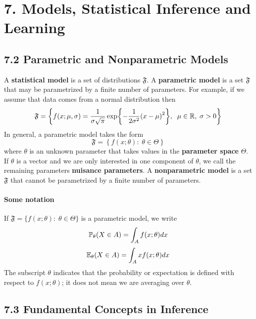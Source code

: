 \section*{7. Models, Statistical Inference and Learning}\label{models-statistical-inference-and-learning}

\subsection*{7.2 Parametric and Nonparametric
Models}\label{parametric-and-nonparametric-models}
A \textbf{statistical model} is a set of distributions \(\mathfrak{F}\).
A \textbf{parametric model} is a set \(\mathfrak{F}\) that may be
parametrized by a finite number of parameters. For example, if we assume
that data comes from a normal distribution then
\[
\mathfrak{F} = \left\{ f(x; \mu, \sigma) = 
\frac{1}{\sigma\sqrt{\pi}} \exp \left\{ -\frac{1}{2\sigma^{2}} \left(x - \mu \right)^{2} \right\}, \; \; 
\mu \in \R, \; \sigma > 0
\right\}
\]
In general, a parametric model takes the form
\[
\mathfrak{F} = \left\{ f(x; \theta) : \; \theta \in \Theta \right\}
\]
where \(\theta\) is an unknown parameter that takes values in the
\textbf{parameter space} \(\Theta\).
If \(\theta\) is a vector and we are only interested in one component of
\(\theta\), we call the remaining parameters \textbf{nuisance
parameters}.
A \textbf{nonparametric model} is a set \(\mathfrak{F}\) that cannot be
parametrized by a finite number of parameters.
\paragraph{Some notation}\label{some-notation}
If \(\mathfrak{F} = \{ f(x; \theta) : \; \theta \in \Theta \}\) is a
parametric model, we write
\[
\operatorname{\mathbb{P}}_\theta(X \in A) = \int_A f(x; \theta)dx
\]
\[
\operatorname{\mathbb{E}}_{\theta}(X \in A) = \int_A x f(x; \theta)dx
\]
The subscript \(\theta\) indicates that the probability or expectation
is defined with respect to \(f(x; \theta)\); it does not mean we are
averaging over \(\theta\).

\subsection*{7.3 Fundamental Concepts in
Inference}\label{fundamental-concepts-in-inference}
